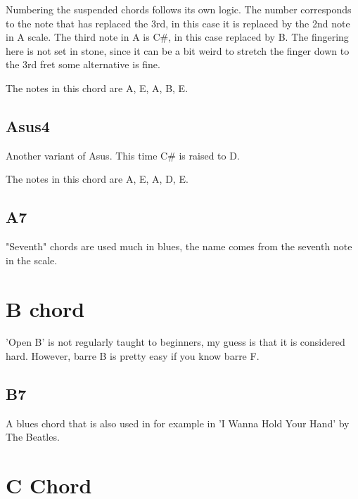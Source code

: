 \documentclass[11pt]{book}
\begin{document}
    Numbering the suspended chords follows its own logic.
    The number corresponds to the note that has replaced the 3rd, in this case it is replaced by the 2nd note in A scale.
    The third note in A is C\#, in this case replaced by B.
    The fingering here is not set in stone, since it can be a bit weird to stretch the finger down to the 3rd fret some alternative is fine.


    \chordscheme[
        name = Asus2,
        finger = {2/4:2,2/3:3},
        mute = {6},
        ring = {5,2,1}
    ]

    The notes in this chord are A, E, A, B, E.

    \subsection{Asus4}
    Another variant of Asus.
    This time C\# is raised to D.

    \chordscheme[
    name = Asus4,
    finger = {2/4:2, 2/3:3, 3/2:(3/4)},
    mute = {6},
    ring = {5,1}
    ]

    The notes in this chord are A, E, A, D, E.

    \subsection{A7}
    "Seventh" chords are used much in blues, the name comes from the seventh note in the scale.

    \chordscheme[
        name = A7,
        finger = {2/4:2, 3/2:4},
        mute = {6},
        ring = {5,3,1}
    ]


    \section{B chord}
    'Open B' is not regularly taught to beginners, my guess is that it is considered hard.
    However, barre B is pretty easy if you know barre F.

    \subsection{B7}
    A blues chord that is also used in for example in 'I Wanna Hold Your Hand' by The Beatles.

    \chordscheme[
        name = B7,
        finger = {2/5:1, 1/4:2, 2/3:3, 2/1:4},
        mute = {6},
        ring = {2}
    ]


    \section{C Chord}
\end{document}
